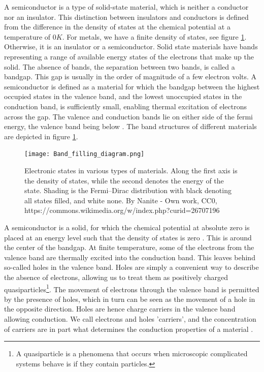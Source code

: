 \documentclass[../main.tex]{subfiles}
\begin{document}
	A semiconductor is a type of solid-state material, which is neither a conductor nor an insulator\cite{solidstatephysicsbook}. This distinction between insulators and conductors is defined from the difference in the density of states at the chemical potential at a temperature of $0K$\cite{solidstatephysicsbook}. For metals, we have a finite density of states, see figure \ref{fig:bands}. Otherwise, it is an insulator or a semiconductor. Solid state materials have bands representing a range of available energy states of the electrons that make up the solid. The absence of bands, the separation between two bands, is called a bandgap. This gap is usually in the order of magnitude of a few electron volts. A semiconductor is defined as a material for which the bandgap between the highest occupied states in the valence band, and the lowest unoccupied states in the conduction band, is sufficiently small, enabling thermal excitation of electrons across the gap. The valence and conduction bands lie on either side of the fermi energy, the valence band being below \cite{solidstatephysicsbook}. The band structures of different materials are depicted in figure \ref{fig:bands}.
	
	\begin{figure}[h!]
		\centering
		\texttt{[image: Band\_filling\_diagram.png]}
		\caption{Electronic states in various types of materials. Along the first axis is the density of states, while the second denotes the energy of the state. Shading is the Fermi–Dirac distribution with black denoting all states filled, and white none. By Nanite - Own work, CC0, https://commons.wikimedia.org/w/index.php?curid=26707196}
		\label{fig:bands}
	\end{figure}
	
	A semiconductor is a solid, for which the chemical potential at absolute zero is placed at an energy level such that the density of states is zero \cite{solidstatephysicsbook}. This is around the center of the bandgap. At finite temperature, some of the electrons from the valence band are thermally excited into the conduction band. This leaves behind so-called holes in the valence band. Holes are simply a convenient way to describe the absence of electrons, allowing us to treat them as positively charged quasiparticles\footnote{A quasiparticle is a phenomena that occurs when microscopic complicated systems behave is if they contain particles.}. The movement of electrons through the valence band is permitted by the presence of holes, which in turn can be seen as the movement of a hole in the opposite direction. Holes are hence charge carriers in the valence band allowing conduction. We call electrons and holes 'carriers', and the concentration of carriers are in part what determines the conduction properties of a material \cite{solidstatephysicsbook}.  
	
\end{document}

